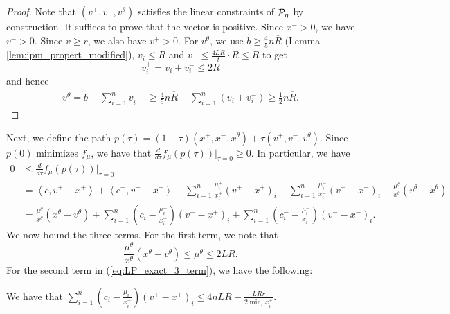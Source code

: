 \begin{proof}
Note that $(v^{+},v^{-},v^{\theta})$ satisfies the linear constraints
of $\mathcal{P}_{\eta}$ by construction. It suffices to prove that the
vector is positive. Since $x^{-}>0$, we have $v^{-}>0$. Since $v\geq r$,
we also have $v^{+}>0$. For $v^{\theta}$, we use $\widetilde{b}\geq\frac{4}{5}n\overline{R}$
(Lemma \ref{lem:ipm_propert_modified}), $v_{i}\leq R$ and $v^{-}\leq\frac{4L\overline{R}}{t}\cdot R\leq R$
to get
\begin{equation}
v^{+}_{i}=v_{i}+v^{-}_{i}\leq2R\label{eq:v_plus_upper}
\end{equation}
and hence
\begin{align*}
v^{\theta}=\widetilde{b}-\sum^{n}_{i=1}v^{+}_{i} & \geq\frac{4}{5}n\overline{R}-\sum^{n}_{i=1}(v_{i}+v^{-}_{i})\geq\frac{1}{2}n\overline{R}.
\end{align*}
\end{proof}
Next, we define the path $p(\tau)=(1-\tau)(x^{+},x^{-},x^{\theta})+\tau(v^{+},v^{-},v^{\theta})$.
Since $p(0)$ minimizes $f_{\mu}$, we have that $\frac{d}{d\tau}f_{\mu}(p(\tau))|_{\tau=0}\geq0$.
In particular, we have
\begin{align}
0 & \leq\frac{d}{d\tau}f_{\mu}(p(\tau))|_{\tau=0}\nonumber \\
 & =\left\langle c,v^{+}-x^{+}\right\rangle +\left\langle c^{-},v^{-}-x^{-}\right\rangle -\sum^{n}_{i=1}\frac{\mu^{+}_{i}}{x^{+}_{i}}(v^{+}-x^{+})_{i}-\sum^{n}_{i=1}\frac{\mu^{-}_{i}}{x^{-}_{i}}(v^{-}-x^{-})_{i}-\frac{\mu^{\theta}}{x^{\theta}}(v^{\theta}-x^{\theta})\nonumber \\
 & =\frac{\mu^{\theta}}{x^{\theta}}(x^{\theta}-v^{\theta})+\sum^{n}_{i=1}(c_{i}-\frac{\mu^{+}_{i}}{x^{+}_{i}})(v^{+}-x^{+})_{i}+\sum^{n}_{i=1}(c^{-}_{i}-\frac{\mu^{-}_{i}}{x^{-}_{i}})(v^{-}-x^{-})_{i}.\label{eq:LP_exact_3_term}
\end{align}
We now bound the three terms. For the first term, we note that 
\begin{equation}
\frac{\mu^{\theta}}{x^{\theta}}(x^{\theta}-v^{\theta})\leq\mu^{\theta}\leq2LR.\label{eq:LP_exact_3_term_1}
\end{equation}
For the second term in (\ref{eq:LP_exact_3_term}), we have the following:
\begin{lem}
\label{lem:LP_exact_3_term_1}We have that $\sum^{n}_{i=1}(c_{i}-\frac{\mu^{+}_{i}}{x^{+}_{i}})(v^{+}-x^{+})_{i}\leq4nLR-\frac{LRr}{2\min_{i}x^{+}_{i}}$.
\end{lem}

